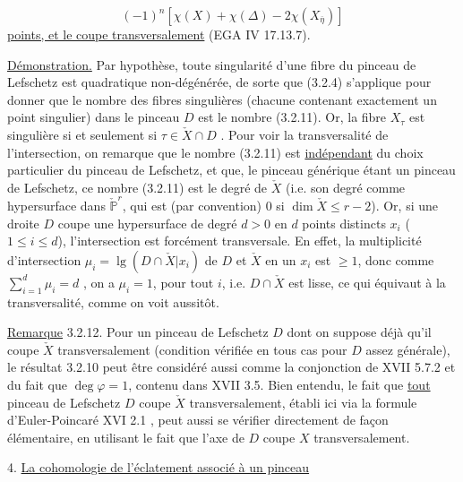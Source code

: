 \begin{equation}\tag{3.2.11}
(-1)^{n} [ \chi(X) + \chi(\Delta) - 2 \chi (X_{\overline{\eta}})]
\end{equation}
\underline{points, et le coupe transversalement} (EGA IV 17.13.7).

\underline{Démonstration.} Par hypothèse, toute singularité d'une fibre du pinceau de Lefschetz est quadratique non-dégénérée, de sorte que (3.2.4) s'applique pour donner que le nombre des fibres singulières (chacune contenant exactement un point singulier) dans le pinceau $D$ est le nombre (3.2.11). Or, la fibre $X_{\tau}$ est singulière si et seulement si $\tau \in \check{X} \cap D$ . Pour voir la transversalité de l'intersection, on remarque que le nombre (3.2.11) est \underline{indépendant} du choix particulier du pinceau de Lefschetz, et que, le pinceau générique étant un pinceau de Lefschetz, ce nombre (3.2.11) est le degré de $\check{X}$ (i.e. son degré comme hypersurface dans $\check{\mathbb{P}}^{r}$, qui est (par convention) $0$ si $\dim \check{X} \leq r-2$). Or, si une droite $D$ coupe une hypersurface de degré $d > 0$ en $d$ points distincts $x_{i}$ ($1 \leq i \leq d$), l'intersection est forcément transversale. En effet, la multiplicité d'intersection $\mu_{i} = \operatorname{lg}(D \cap \check{X}|x_{i})$ de $D$ et $\check{X}$ en un $x_{i}$ est $\geq 1$, donc comme $\sum\limits_{i=1}^{d} \mu_{i} = d$ , on a $\mu_{i} = 1$, pour tout $i$, i.e. $D \cap \check{X}$ est lisse, ce qui équivaut à la transversalité, comme on voit aussitôt.



\underline{Remarque} 3.2.12. Pour un pinceau de Lefschetz $D$ dont on suppose déjà qu'il coupe $\check{X}$ transversalement (condition vérifiée en tous cas pour $D$ assez générale), le résultat 3.2.10 peut être considéré aussi comme la conjonction de XVII 5.7.2 et du fait que $\deg \varphi = 1$, contenu dans XVII 3.5. Bien entendu, le fait que \underline{tout} pinceau de Lefschetz $D$ coupe $\check{X}$ transversalement, établi ici via la formule d'Euler-Poincaré XVI 2.1 , peut aussi se vérifier directement de façon élémentaire, en utilisant le fait que l'axe de $D$ coupe $X$ transversalement.


4. \underline{La cohomologie de l'éclatement associé à un pinceau}

